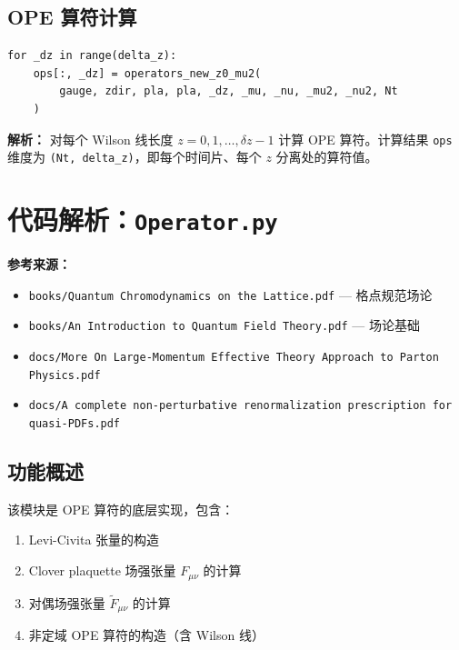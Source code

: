 \documentclass[12pt,a4paper]{ctexart}
\begin{document}
\subsection{OPE 算符计算}

\begin{lstlisting}[caption={对所有 z 计算 OPE 算符}]
for _dz in range(delta_z):
    ops[:, _dz] = operators_new_z0_mu2(
        gauge, zdir, pla, pla, _dz, _mu, _nu, _mu2, _nu2, Nt
    )
\end{lstlisting}

\textbf{解析：}
对每个 Wilson 线长度 $z = 0, 1, \ldots, \delta z - 1$ 计算 OPE 算符。计算结果 \texttt{ops} 维度为 \texttt{(Nt, delta\_z)}，即每个时间片、每个 $z$ 分离处的算符值。

\section{代码解析：\texttt{Operator.py}}
\label{sec:operator}

\textbf{参考来源：}
\begin{itemize}
    \item \texttt{books/Quantum Chromodynamics on the Lattice.pdf} — 格点规范场论
    \item \texttt{books/An Introduction to Quantum Field Theory.pdf} — 场论基础
    \item \texttt{docs/More On Large-Momentum Effective Theory Approach to Parton Physics.pdf}
    \item \texttt{docs/A complete non-perturbative renormalization prescription for quasi-PDFs.pdf}
\end{itemize}

\subsection{功能概述}

该模块是 OPE 算符的底层实现，包含：
\begin{enumerate}
    \item Levi-Civita 张量的构造
    \item Clover plaquette 场强张量 $F_{\mu\nu}$ 的计算
    \item 对偶场强张量 $\tilde{F}_{\mu\nu}$ 的计算
    \item 非定域 OPE 算符的构造（含 Wilson 线）
\end{enumerate}
\end{document}
